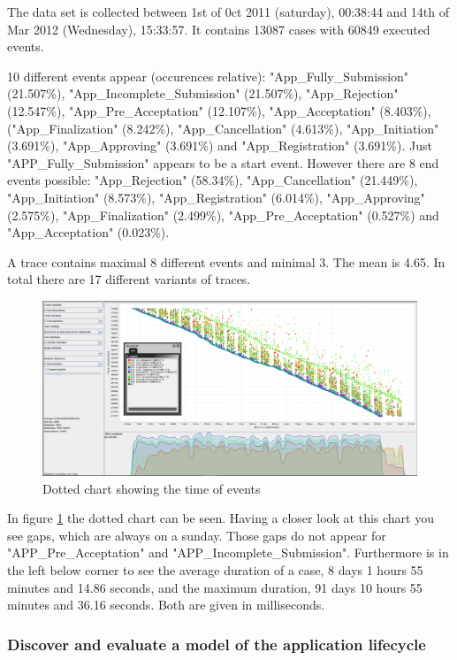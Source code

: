 The data set is collected between 1st of 0ct 2011 (saturday), 00:38:44 and 14th of Mar 2012 (Wednesday), 15:33:57. It contains 13087 cases with 60849 executed events.

10 different events appear (occurences relative): "App\_Fully\_Submission" (21.507\%), "App\_Incomplete\_Submission" (21.507\%), "App\_Rejection" (12.547\%), "App\_Pre\_Acceptation" (12.107\%), "App\_Acceptation" (8.403\%), ("App\_Finalization" (8.242\%), "App\_Cancellation" (4.613\%), "App\_Initiation" (3.691\%), "App\_Approving" (3.691\%) and "App\_Registration" (3.691\%). Just "APP\_Fully\_Submission" appears to be a start event. However there are 8 end events possible: "App\_Rejection" (58.34\%), "App\_Cancellation" (21.449\%), "App\_Initiation" (8.573\%), "App\_Registration" (6.014\%), "App\_Approving" (2.575\%), "App\_Finalization" (2.499\%), "App\_Pre\_Acceptation" (0.527\%) and "App\_Acceptation" (0.023\%).


A trace contains maximal 8 different events and minimal 3. The mean is 4.65. In total there are 17 different variants of traces. 


\begin{figure}[!htbp]
\centering
\includegraphics[height = 0.2\textheight]{AppData.PNG}
\caption{Dotted chart showing the time of events}
\label{fig:AppTimeFlow}
\end{figure}

In figure \ref{fig:AppTimeFlow} the dotted chart can be seen. Having a closer look at this chart you see gaps, which are always on a sunday. Those gaps do not appear for "APP\_Pre\_Acceptation" and "APP\_Incomplete\_Submission". Furthermore is in the left below corner to see the average duration of a case, 8 days 1 hours 55 minutes and 14.86 seconds, and the maximum duration, 91 days 10 hours 55 minutes and 36.16 seconds. Both are given in milliseconds.


\subsubsection{Discover and evaluate a model of the application lifecycle}

